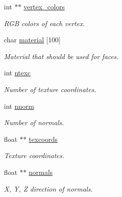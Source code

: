 \begin{DoxyCompactItemize}
\mbox{\label{structobj__t_a26c45b63e6ff01ff6f9f1d5f25bb7d0b}} 
int $\ast$$\ast$ \mbox{\hyperlink{structobj__t_a26c45b63e6ff01ff6f9f1d5f25bb7d0b}{vertex\+\_\+colors}}
\begin{DoxyCompactList}\small\item\em R\+GB colors of each vertex. \end{DoxyCompactList}\item 
\mbox{\label{structobj__t_ac8ff1d64bfbec1df635bf72ba7fd5486}} 
char \mbox{\hyperlink{structobj__t_ac8ff1d64bfbec1df635bf72ba7fd5486}{material}} \mbox{[}100\mbox{]}
\begin{DoxyCompactList}\small\item\em Material that should be used for faces. \end{DoxyCompactList}\item 
\mbox{\label{structobj__t_aaa36aa6eda039139d79a807b591d1a1a}} 
int \mbox{\hyperlink{structobj__t_aaa36aa6eda039139d79a807b591d1a1a}{ntexc}}
\begin{DoxyCompactList}\small\item\em Number of texture coordinates. \end{DoxyCompactList}\item 
\mbox{\label{structobj__t_aeaae61787b92ea57ef185bdd9e996b02}} 
int \mbox{\hyperlink{structobj__t_aeaae61787b92ea57ef185bdd9e996b02}{nnorm}}
\begin{DoxyCompactList}\small\item\em Number of normals. \end{DoxyCompactList}\item 
\mbox{\label{structobj__t_a9477aca6c3d6977280f1082410576438}} 
float $\ast$$\ast$ \mbox{\hyperlink{structobj__t_a9477aca6c3d6977280f1082410576438}{texcoords}}
\begin{DoxyCompactList}\small\item\em Texture coordinates. \end{DoxyCompactList}\item 
\mbox{\label{structobj__t_ac61278759dc377f187ce6ae7c8b3c668}} 
float $\ast$$\ast$ \mbox{\hyperlink{structobj__t_ac61278759dc377f187ce6ae7c8b3c668}{normals}}
\begin{DoxyCompactList}\small\item\em X, Y, Z direction of normals. \end{DoxyCompactList}\item 
$$
\end{DoxyCompactItemize}
